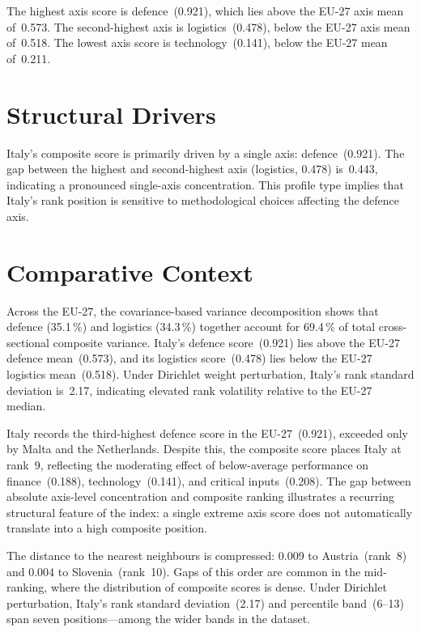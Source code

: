 \documentclass[12pt,a4paper]{article}
\begin{document}
The highest axis score is defence~(0.921), which lies above the EU-27 axis mean of~0.573.  The second-highest axis is logistics~(0.478), below the EU-27 axis mean of~0.518.  The lowest axis score is technology~(0.141), below the EU-27 mean of~0.211.


\section{Structural Drivers}
\label{sec:drivers}

\begin{sloppypar}
Italy's composite score is primarily driven by a single axis: defence~(0.921).  The gap between the highest and second-highest axis (logistics, 0.478) is~0.443, indicating a pronounced single-axis concentration.  This profile type implies that Italy's rank position is sensitive to methodological choices affecting the defence axis.
\end{sloppypar}


\section{Comparative Context}
\label{sec:comparative}

Across the EU-27, the covariance-based variance decomposition shows that defence (35.1\,\%) and logistics (34.3\,\%) together account for 69.4\,\% of total cross-sectional composite variance.  Italy's defence score~(0.921) lies above the EU-27 defence mean~(0.573), and its logistics score~(0.478) lies below the EU-27 logistics mean~(0.518).  Under Dirichlet weight perturbation, Italy's rank standard deviation is~2.17, indicating elevated rank volatility relative to the EU-27 median.



Italy records the third-highest defence score in the EU-27~(0.921), exceeded only by Malta and the Netherlands.  Despite this, the composite score places Italy at rank~9, reflecting the moderating effect of below-average performance on finance~(0.188), technology~(0.141), and critical inputs~(0.208).  The gap between absolute axis-level concentration and composite ranking illustrates a recurring structural feature of the index: a single extreme axis score does not automatically translate into a high composite position.

The distance to the nearest neighbours is compressed: 0.009 to Austria~(rank~8) and 0.004 to Slovenia~(rank~10).  Gaps of this order are common in the mid-ranking, where the distribution of composite scores is dense.  Under Dirichlet perturbation, Italy's rank standard deviation~(2.17) and percentile band~(6--13) span seven positions---among the wider bands in the dataset.
\end{document}
